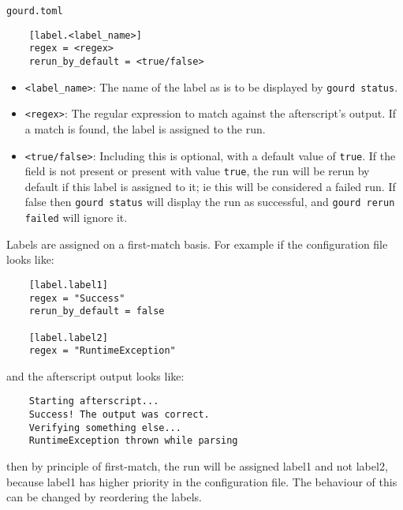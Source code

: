 \texttt{gourd.toml}
\begin{verbatim}
    [label.<label_name>]
    regex = <regex>
    rerun_by_default = <true/false>
\end{verbatim}
\begin{itemize}
    \item \verb|<label_name>|: The name of the label as is to be displayed by \verb|gourd status|.
    \item \verb|<regex>|: The regular expression to match against the afterscript's output.
    If a match is found, the label is assigned to the run.
    \item \verb|<true/false>|: Including this is optional, with a default value of \verb|true|.
    If the field is not present or present with value \verb|true|, the run will be rerun by default if this label is assigned to it; ie this will be considered a failed run.
    If false then \verb|gourd status| will display the run as successful, and \verb|gourd rerun failed| will ignore it.
\end{itemize}
Labels are assigned on a first-match basis. For example if the configuration file looks like:
\begin{verbatim}
    [label.label1]
    regex = "Success"
    rerun_by_default = false

    [label.label2]
    regex = "RuntimeException"
\end{verbatim}
and the afterscript output looks like:
\begin{verbatim}
    Starting afterscript...
    Success! The output was correct.
    Verifying something else...
    RuntimeException thrown while parsing
\end{verbatim}
then by principle of first-match, the run will be assigned label1 and not label2, because label1 has higher priority in the configuration file.
The behaviour of this can be changed by reordering the labels.